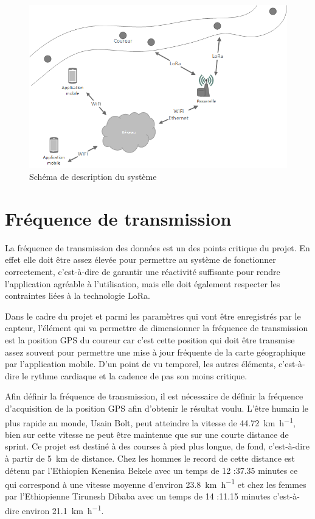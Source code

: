 \begin{figure}[htb]
\centering 
\includegraphics[width=1\columnwidth]{../images/schema_systeme_projet.png} 
\caption[ElemSystem]{Schéma de description du système}
\label{fig:elem_system}
\end{figure}

\section{Fréquence de transmission}

La fréquence de transmission des données est un des points critique du projet. En effet elle doit être assez élevée pour permettre au système de fonctionner correctement, c’est-à-dire de garantir une réactivité suffisante pour rendre l’application agréable à l’utilisation, mais elle doit également respecter les contraintes liées à la technologie LoRa.

Dans le cadre du projet et parmi les paramètres qui vont être enregistrés par le capteur, l’élément qui va permettre de dimensionner la fréquence de transmission est la position GPS du coureur car c’est cette position qui doit être transmise assez souvent pour permettre une mise à jour fréquente de la carte géographique par l’application mobile. D’un point de vu temporel, les autres éléments, c’est-à-dire le rythme cardiaque et la cadence de pas son moins critique.

Afin définir la fréquence de transmission, il est nécessaire de définir la fréquence d’acquisition de la position GPS afin d’obtenir le résultat voulu. L’être humain le plus rapide au monde, Usain Bolt, peut atteindre la vitesse de \SI{44.72}{\km\per\hour}, bien sur cette vitesse ne peut être maintenue que sur une courte distance de sprint. Ce projet est destiné à des courses à pied plus longue, de fond, c’est-à-dire à partir de \SI{5}{\km} de distance. Chez les hommes le record de cette distance est détenu par l’Ethiopien Kenenisa Bekele avec un temps de 12 :37.35 minutes ce qui correspond à une vitesse moyenne d’environ \SI{23.8}{\km\per\hour} et chez les femmes par l’Ethiopienne Tirunesh Dibaba avec un temps de 14 :11.15 minutes c’est-à-dire environ \SI{21.1}{\km\per\hour}. \cite{iaff_all_time_top_list}

